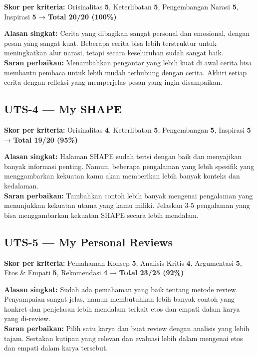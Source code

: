 \documentclass[
  letterpaper,
  DIV=11,
  numbers=noendperiod]{scrreprt}
\begin{document}
\textbf{Skor per kriteria:} Orisinalitas \textbf{5}, Keterlibatan
\textbf{5}, Pengembangan Narasi \textbf{5}, Inspirasi \textbf{5} →
\textbf{Total 20/20 (100\%)}

\textbf{Alasan singkat:} Cerita yang dibagikan sangat personal dan
emosional, dengan pesan yang sangat kuat. Beberapa cerita bisa lebih
terstruktur untuk meningkatkan alur narasi, tetapi secara keseluruhan
sudah sangat baik.\\
\textbf{Saran perbaikan:} Menambahkan pengantar yang lebih kuat di awal
cerita bisa membantu pembaca untuk lebih mudah terhubung dengan cerita.
Akhiri setiap cerita dengan refleksi yang memperjelas pesan yang ingin
disampaikan.

\subsection{UTS-4 --- My SHAPE}\label{uts-4-my-shape}

\textbf{Skor per kriteria:} Orisinalitas \textbf{4}, Keterlibatan
\textbf{5}, Pengembangan \textbf{5}, Inspirasi \textbf{5} →
\textbf{Total 19/20 (95\%)}

\textbf{Alasan singkat:} Halaman SHAPE sudah terisi dengan baik dan
menyajikan banyak informasi penting. Namun, beberapa pengalaman yang
lebih spesifik yang menggambarkan kekuatan kamu akan memberikan lebih
banyak konteks dan kedalaman.\\
\textbf{Saran perbaikan:} Tambahkan contoh lebih banyak mengenai
pengalaman yang menunjukkan kekuatan utama yang kamu miliki. Jelaskan
3-5 pengalaman yang bisa menggambarkan kekuatan SHAPE secara lebih
mendalam.

\subsection{UTS-5 --- My Personal
Reviews}\label{uts-5-my-personal-reviews-1}

\textbf{Skor per kriteria:} Pemahaman Konsep \textbf{5}, Analisis Kritis
\textbf{4}, Argumentasi \textbf{5}, Etos \& Empati \textbf{5},
Rekomendasi \textbf{4} → \textbf{Total 23/25 (92\%)}

\textbf{Alasan singkat:} Sudah ada pemahaman yang baik tentang metode
review. Penyampaian sangat jelas, namun membutuhkan lebih banyak contoh
yang konkret dan penjelasan lebih mendalam terkait etos dan empati dalam
karya yang di-review.\\
\textbf{Saran perbaikan:} Pilih satu karya dan buat review dengan
analisis yang lebih tajam. Sertakan kutipan yang relevan dan evaluasi
lebih dalam mengenai etos dan empati dalam karya tersebut.
\end{document}
